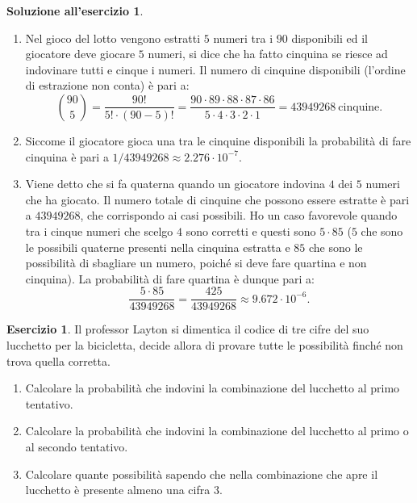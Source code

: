 \documentclass[12pt,a4paper]{article}
\theoremstyle{definition}
\newtheorem{sol}{Soluzione all'esercizio}
\newtheorem{exe}{Esercizio}
\begin{document}
\begin{sol}\mbox{}\vspace{-0.7cm}\\
	\begin{enumerate}
		\item Nel gioco del lotto vengono estratti $ 5 $ numeri tra i $ 90 $ disponibili ed il giocatore deve giocare $ 5 $ numeri, si dice che ha fatto cinquina se riesce ad indovinare tutti e cinque i numeri. Il numero di cinquine disponibili (l'ordine di estrazione non conta) è pari a:
		      \[ \binom{90}{5} = \frac{90!}{5!\cdot (90-5)!} = \frac{90\cdot 89\cdot 88\cdot 87\cdot 86}{5\cdot 4\cdot 3\cdot 2\cdot 1} = 43949268 \ \text{cinquine.} \]
		\item Siccome il giocatore gioca una tra le cinquine disponibili la probabilità di fare cinquina è pari a $ 1/43949268 \approx 2.276 \cdot 10^{-7} $.
		\item Viene detto che si fa quaterna quando un giocatore indovina $ 4 $ dei $ 5 $ numeri che ha giocato. Il numero totale di cinquine che possono essere estratte è pari a $ 43949268 $, che corrispondo ai casi possibili. Ho un caso favorevole quando tra i cinque numeri che scelgo $ 4 $ sono corretti e questi sono $ 5\cdot 85 $ ($ 5 $ che sono le possibili quaterne presenti nella cinquina estratta e $ 85 $ che sono le possibilità di sbagliare un numero, poiché si deve fare quartina e non cinquina). La probabilità di fare quartina è dunque pari a:
		      \[ \frac{5 \cdot 85}{43949268} = \frac{425}{43949268} \approx 9.672 \cdot 10^{-6}.  \]
	\end{enumerate}
\end{sol}

\begin{exe}
	Il professor Layton si dimentica il codice di tre cifre del suo lucchetto per la bicicletta, decide allora di provare tutte le possibilità finché non trova quella corretta.
	\begin{enumerate}
		\item Calcolare la probabilità che indovini la combinazione del lucchetto al primo tentativo.
		\item Calcolare la probabilità che indovini la combinazione del lucchetto al primo o al secondo tentativo.
		\item Calcolare quante possibilità sapendo che nella combinazione che apre il lucchetto è presente almeno una cifra $ 3 $.
	\end{enumerate}
\end{exe}
\end{document}
